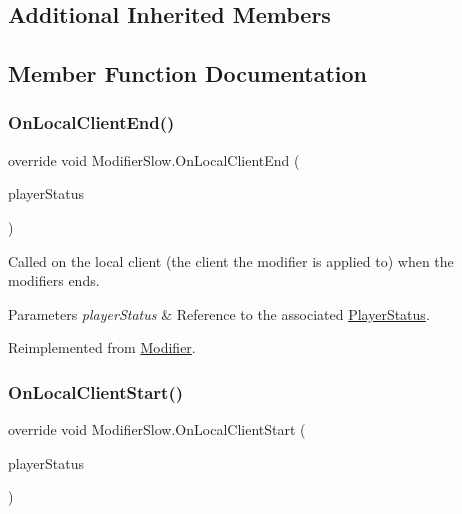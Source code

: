 \subsection*{Additional Inherited Members}


\subsection{Member Function Documentation}
\hypertarget{class_modifier_slow_a0682d3da4434ef281fbffccf34501eb3}{}\label{class_modifier_slow_a0682d3da4434ef281fbffccf34501eb3} 
\subsubsection{\texorpdfstring{On\+Local\+Client\+End()}{OnLocalClientEnd()}}
{\footnotesize\ttfamily override void Modifier\+Slow.\+On\+Local\+Client\+End (\begin{DoxyParamCaption}\item[{\hyperlink{class_player_status}{Player\+Status}}]{player\+Status }\end{DoxyParamCaption})\hspace{0.3cm}{\ttfamily [virtual]}}



Called on the local client (the client the modifier is applied to) when the modifiers ends. 


\begin{DoxyParams}{Parameters}
{\em player\+Status} & Reference to the associated \hyperlink{class_player_status}{Player\+Status}.\\
\hline
\end{DoxyParams}


Reimplemented from \hyperlink{class_modifier_a1ea2aa04b05628c1965570396e390281}{Modifier}.

\hypertarget{class_modifier_slow_a1eef9ea247bc45bf06b4c56c1a4803d0}{}\label{class_modifier_slow_a1eef9ea247bc45bf06b4c56c1a4803d0} 
\subsubsection{\texorpdfstring{On\+Local\+Client\+Start()}{OnLocalClientStart()}}
{\footnotesize\ttfamily override void Modifier\+Slow.\+On\+Local\+Client\+Start (\begin{DoxyParamCaption}\item[{\hyperlink{class_player_status}{Player\+Status}}]{player\+Status }\end{DoxyParamCaption})\hspace{0.3cm}{\ttfamily [virtual]}}



